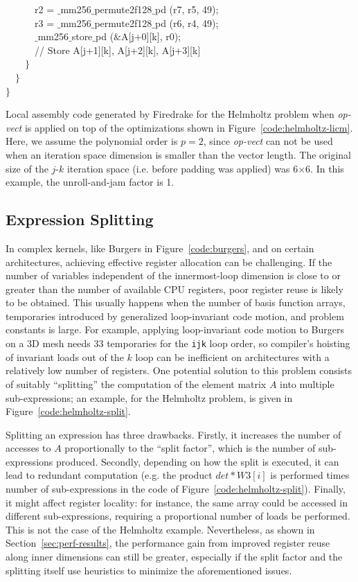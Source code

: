 \documentclass[conference]{IEEEtran}
\begin{document}
\begin{algorithm}[t]
~~~~~~r2 = $\_$mm256$\_$permute2f128$\_$pd (r7, r5, 49);\\
~~~~~~r3 = $\_$mm256$\_$permute2f128$\_$pd (r6, r4, 49);\\
~~~~~~$\_$mm256$\_$store$\_$pd ($\&$A[j+0][k], r0);\\
~~~~~~// Store A[j+1][k], A[j+2][k], A[j+3][k]\\
~~~~$\rbrace$\\
~~$\rbrace$\\
$\rbrace$
\caption{Local assembly code generated by Firedrake for the Helmholtz problem when \emph{op-vect} is applied on top of the optimizations shown in Figure~\ref{code:helmholtz-licm}. Here, we assume the polynomial order is $p=2$, since \emph{op-vect} can not be used when an iteration space dimension is smaller than the vector length. The original size of the $j$-$k$ iteration space (i.e. before padding was applied) was 6$\times$6. In this example, the unroll-and-jam factor is 1.}
\label{code:helmholtz-opvect}
\end{algorithm}



\subsection{Expression Splitting}
\label{sec:expr-split}
In complex kernels, like Burgers in Figure~\ref{code:burgers}, and on certain architectures, achieving effective register allocation can be challenging. If the number of variables independent of the innermost-loop dimension is close to or greater than the number of available CPU registers, poor register reuse is likely to be obtained. This usually happens when the number of basis function arrays, temporaries introduced by generalized loop-invariant code motion, and problem constants is large. For example, applying loop-invariant code motion to Burgers on a 3D mesh needs 33 temporaries for the \texttt{ijk} loop order, so compiler's hoisting of invariant loads out of the $k$ loop can be inefficient on architectures with a relatively low number of registers. One potential solution to this problem consists of suitably ``splitting'' the computation of the element matrix $A$ into multiple sub-expressions; an example, for the Helmholtz problem, is given in Figure~\ref{code:helmholtz-split}. 

Splitting an expression has three drawbacks. Firstly, it increases the number of accesses to $A$ proportionally to the ``split factor'', which is the number of sub-expressions produced. Secondly, depending on how the split is executed, it can lead to redundant computation (e.g. the product $det*W3[i]$ is performed times number of sub-expressions in the code of Figure~\ref{code:helmholtz-split}). Finally, it might affect register locality: for instance, the same array could be accessed in different sub-expressions, requiring a proportional number of loads be performed. This is not the case of the Helmholtz example. Nevertheless, as shown in Section~\ref{sec:perf-results}, the performance gain from improved register reuse along inner dimensions can still be greater, especially if the split factor and the splitting itself use heuristics to minimize the aforementioned issues.
\end{document}
